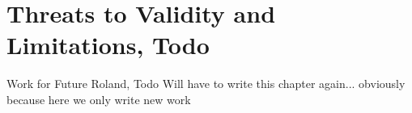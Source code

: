 \section{Threats to Validity and Limitations, Todo}
Work for Future Roland, Todo
Will have to write this chapter again... obviously because here we only write new work

